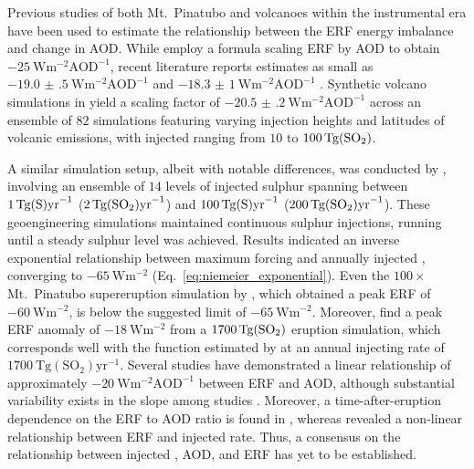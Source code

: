 \documentclass[draft]{agujournal2019}
\begin{document}
  Previous studies of both Mt.\ Pinatubo \cite{mills2017,hansen2005} and volcanoes
  within the instrumental era \cite{gregory2016} have been used to estimate the
  relationship between the ERF energy imbalance and change in AOD. While
   employ a formula scaling ERF by AOD to obtain
  \(\SI{-25}{\watt\metre^{-2}\mathrm{AOD}^{-1}}\), recent literature reports estimates
  as small as {\(\SI{-19.0(5)}{\watt\metre^{-2}\mathrm{AOD}^{-1}}\)} \cite{gregory2016}
  and \(\SI{-18.3(10)}{\watt\metre^{-2}\mathrm{AOD}^{-1}}\) \cite{mills2017}. Synthetic
  volcano simulations in  yield a scaling factor of
  \(\SI{-20.5(2)}{\watt\metre^{-2}\mathrm{AOD}^{-1}}\) across an ensemble of \(82\)
  simulations featuring varying injection heights and latitudes of volcanic emissions,
  with injected  ranging from \(10\) to \(\SI{100}{\tera\gram(\ce{SO2})}\).

  A similar simulation setup, albeit with notable differences, was conducted by
  , involving an ensemble of \(14\) levels of injected sulphur
  spanning between \(\SI{1}{\tera\gram(\ce{S})\mathrm{yr}^{-1}}\)
  (\(\SI{2}{\tera\gram(\ce{SO2})\mathrm{yr}^{-1}}\)) and
  \(\SI{100}{\tera\gram(\ce{S})\mathrm{yr}^{-1}}\)
  (\(\SI{200}{\tera\gram(\ce{SO2})\mathrm{yr}^{-1}}\)). These geoengineering simulations
  maintained continuous sulphur injections, running until a steady sulphur level was
  achieved. Results indicated an inverse exponential relationship between maximum
  forcing and annually injected , converging to \(\SI{-65}{\watt\metre^{-2}}\)
  (Eq.~\ref{eq:niemeier_exponential}). Even the \(100\times\) Mt.\ Pinatubo
  supereruption simulation by , which obtained a peak ERF of
  \(\SI{-60}{\watt\metre^{-2}}\), is below the suggested limit of
  \(\SI{-65}{\watt\metre^{-2}}\). Moreover,  find a peak ERF anomaly
  of \(\SI{-18}{\watt\metre^{-2}}\) from a \(\SI{1700}{\tera\gram(\ce{SO2})}\) eruption
  simulation, which corresponds well with the function estimated by 
  at an annual injecting rate of
  \(\SI{1700}{\tera\gram(\mathrm{SO_2})\mathrm{yr}^{-1}}\). Several studies have
  demonstrated a linear relationship of approximately
  \(-\SI{20}{\watt\metre^{-2}\mathrm{AOD}^{-1}}\) between ERF and AOD, although
  substantial variability exists in the slope among studies
  \cite{mills2017,hansen2005,gregory2016,marshall2020,pitari2016b}. Moreover, a
  time-after-eruption dependence on the ERF to AOD ratio is found in
  , whereas  revealed a non-linear relationship
  between ERF and injected  rate. Thus, a consensus on the relationship between
  injected , AOD, and ERF has yet to be established.
\end{document}
